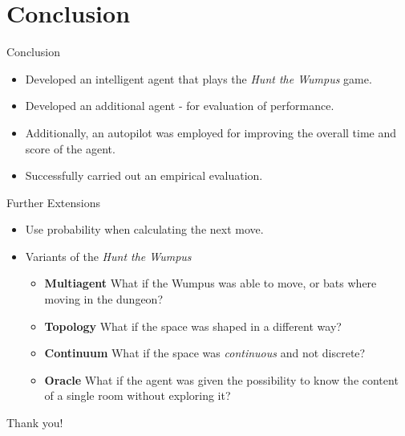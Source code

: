 \documentclass[smaller,dvipsnames,ratio=169]{beamer}
\newcommand{\htw}{\emph{Hunt the Wumpus }}
\begin{document}
	

  \section{Conclusion}

  \begin{frame}{Conclusion}
  	\begin{itemize}
  		\item Developed an intelligent agent that plays the \htw game. 
  		\item Developed an additional agent - for evaluation of performance.
  		\item  Additionally, an autopilot was employed for improving the overall time and score of the agent. 
  		\item Successfully carried out an empirical evaluation. 
  	\end{itemize}
    
  \end{frame}

  \begin{frame}{Further Extensions}
  
  	\begin{itemize}
	  	 \item Use probability when calculating the next move.
		 \item Variants of the \htw
  	  \begin{itemize}
  		\item \textbf{Multiagent} What if the Wumpus was able to move, or bats where moving in the dungeon?
	  	\item \textbf{Topology} What if the space was shaped in a different way?
	  	\item \textbf{Continuum} What if the space was \emph{continuous} and not discrete?
	  	\item \textbf{Oracle} What if the agent was given the possibility to know the content of a single room without exploring it?
  	  \end{itemize}
  	\end{itemize}
  \end{frame}

  \begin{frame}[standout]
    Thank you!
  \end{frame}
\end{document}
